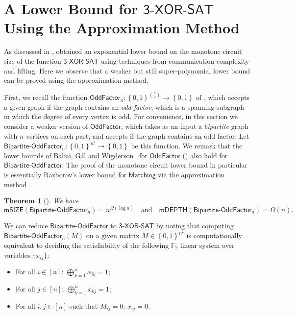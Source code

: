 \documentclass[10pt,a4paper]{article}
\newtheorem{theorem}{Theorem}[section]
\newcommand{\txorsat}{\mathsf{3\mbox{-}XOR\mbox{-}SAT}}
\newcommand{\Cmon}[1]{\mathsf{mSIZE}({#1})}
\newcommand{\mdepth}[1]{\mathsf{mDEPTH}({#1})}
\newcommand{\set}[1]{\left\{#1\right\}}
\newcommand{\blt}{\set{0,1}}
\newcommand{\Matching}{\mathsf{Matching}}
\newcommand{\bigxor}{\bigoplus}
\newcommand{\OddFactor}{\mathsf{OddFactor}}
\newcommand{\BipOddFactor}{\mathsf{Bipartite}\text{-}\OddFactor}
\begin{document}
\section{A Lower Bound for $\txorsat$ Using the Approximation Method}
\label{sec:xorsat-appr}

As discussed in ,
\citep{gkrs19}
obtained an exponential lower bound on the monotone
circuit size of the function $\txorsat$ using techniques from communication
complexity and lifting. Here we observe that a weaker but still
super-polynomial lower bound  can be proved using the approximation method.

First, we recall the
function $\OddFactor_n : \blt^{\binom{n}{2}} \to \blt$
of ,
which accepts 
a 
given graph
if the graph contains an \emph{odd factor},
which is a spanning subgraph in which the degree of every
vertex is odd.
For convenience,
in this section we consider a weaker version of $\OddFactor$, which takes as an input a
\emph{bipartite} graph with $n$ vertices on each part,
and accepts if the graph contains an odd factor.
Let $\BipOddFactor_n : \blt^{n^2} \to \blt$
be this function.
We remark that the lower bounds of
Babai, Gál and Wigderson~\cite{DBLP:journals/combinatorica/BabaiGW99}
for $\OddFactor$ ()
also hold for $\BipOddFactor$.
The proof of the monotone circuit lower bound in particular
is essentially Razborov's lower bound for $\Matching$ via the approximation method~\cite{razborov1985lower}.

\begin{theorem}[\cite{DBLP:journals/combinatorica/BabaiGW99}]
    \label{thm:oddfactor}
    We have
    $$\Cmon{\BipOddFactor_n} = n^{\Omega(\log n)}
    \quad \text{and} \quad 
    \mdepth{\BipOddFactor_n} = \Omega(n).$$
\end{theorem}


We can reduce 
$\BipOddFactor$
to $\txorsat$ by
noting that computing $\BipOddFactor_n(M)$ on a given matrix
$M \in \blt^{n^2}$ is computationally equivalent to deciding the satisfiability of the following $\mathbb{F}_2$ linear system over variables $\{x_{ij}\}$:
\begin{itemize}
    \item For all $i \in [n]$:
        $\bigxor_{k=1}^n x_{ik} = 1$;
    \item For all $j \in [n]$:
        $\bigxor_{k=1}^n x_{kj} = 1$;
    \item For all $i,j \in [n]$ such that $M_{ij} = 0$:
        $x_{ij} = 0$.
\end{itemize}
\end{document}

